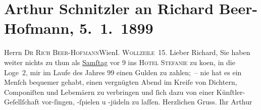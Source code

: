 

         
         \renewcommand{\erwaehntePersonen}{Personen: Richard Beer-Hofmann}
         \renewcommand{\erwaehnteOrte}{Orte: Hotel Stefanie, IX., Alsergrund, Wien, Wollzeile}
         \renewcommand{\erwaehnteWerke}{}
               \section[Arthur Schnitzler an Richard Beer-Hofmann, 5. 1. 1899]{ Arthur Schnitzler an Richard Beer-Hofmann, 5. 1. 1899}\nopagebreak{}\rehead{ }\begin{ledgroupsized}[t]{13cm}\normalsize\beginnumbering \toendnotes[C]{\smallbreak\pagebreak[2]} 
\pstart{}{\pb}Herrn \textsc{Dr Rich
                     Beer-Hofmann}\pend{}\pstart{}Wien\pend{}\pstart{}\textsc{I. Wollzeile 15}.\pend{}{\bigskip}\pstart
           \noindent{}{\pb}Lieber Richard, Sie haben weiter nichts zu thun als \uline{Samſtag} vor 9 ins \textsc{Hotel Stefanie} zu ko{\geminationm}en, in die Loge 2, mir im Laufe des Jahres
                  99 einen Gulden zu zahlen; – nie hat es ein Menſch bequemer gehabt,
               einen vergnügten Abend im {\pb}Kreiſe von Dichtern,
               Componiſten und Lebemä{\geminationn}ern zu verbringen und ſich dazu
               von einer Künſtler-Geſellſchaft vor-ſingen, -ſpielen u -jüdeln zu laſſen. \pend
           \pstart Herzlichen
               Gruss. Ihr
               \spacefill\mbox{Arthur}\pend{}
         
         \endnumbering{}\end{ledgroupsized}  \newcommand{\dateiname}{L00875}\newcommand{\titel}{Arthur Schnitzler an Richard Beer-Hofmann, 5. 1. 1899}\newcommand{\editorInnen}{Martin Anton Müller und Gerd-Hermann Susen}
      